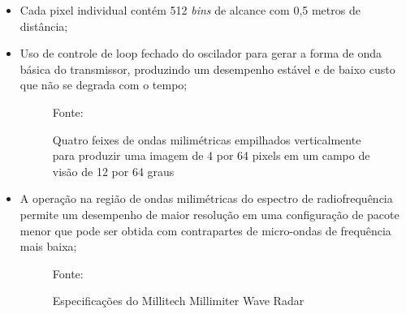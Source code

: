 \documentclass[xcolor=dvipsnames, aspectratio=169]{beamer}
\begin{document}
\begin{frame}
\begin{itemize}
        \item Cada pixel individual contém 512 \textit{bins} de alcance com 0,5 metros de distância;
        \item Uso de controle de loop fechado do oscilador para gerar a forma de onda básica do transmissor, produzindo um desempenho estável e de baixo custo que não se degrada com o tempo;
        \newpage
        \begin{figure}
            \centering
            {Fonte: \cite{everett1995sensors}}
            \caption{Quatro feixes de ondas milimétricas empilhados verticalmente para produzir uma imagem de 4 por 64 pixels em um campo de visão de 12 por 64 graus}
            \label{fig:militech_sensor_data}
        \end{figure}


        \item A operação na região de ondas milimétricas do espectro de radiofrequência permite um desempenho de maior resolução em uma configuração de pacote menor que pode ser obtida com contrapartes de micro-ondas de frequência mais baixa;

        \begin{figure}
            \centering
            {Fonte: \cite{everett1995sensors}}
            \caption{Especificações do Millitech Millimiter Wave Radar}
            \label{fig:militech_specs}
        \end{figure}

	\end{itemize}
\end{frame}
\end{document}
